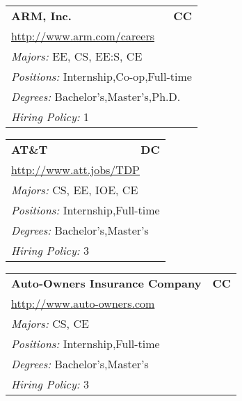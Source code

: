 \documentclass[twoside]{article}
\begin{document}
\begin{center}
\begin{multicols}{3}
\begin{FlushLeft}
\begin{minipage}{\columnwidth}
\end{minipage}
 
\begin{minipage}{\columnwidth}\begin{tabularx}{.95\columnwidth}{Xr}
                 {\Large\bf ARM, Inc.} & {\Large\bf CC}\\
    \multicolumn{2}{p{.95\columnwidth}}{\url{http://www.arm.com/careers}}\\
    \multicolumn{2}{p{.95\columnwidth}}{\emph{Majors:} EE, CS, EE:S, CE}\\
    \multicolumn{2}{p{.95\columnwidth}}{\emph{Positions:} Internship,Co-op,Full-time}\\
    \multicolumn{2}{p{.95\columnwidth}}{\emph{Degrees:} Bachelor's,Master's,Ph.D.}\\
    \multicolumn{2}{p{.95\columnwidth}}{\emph{Hiring Policy:} 1}\\
    \end{tabularx}
    
\end{minipage}
 
\begin{minipage}{\columnwidth}\begin{tabularx}{.95\columnwidth}{Xr}
                 {\Large\bf AT\&T} & {\Large\bf DC}\\
    \multicolumn{2}{p{.95\columnwidth}}{\url{http://www.att.jobs/TDP}}\\
    \multicolumn{2}{p{.95\columnwidth}}{\emph{Majors:} CS, EE, IOE, CE}\\
    \multicolumn{2}{p{.95\columnwidth}}{\emph{Positions:} Internship,Full-time}\\
    \multicolumn{2}{p{.95\columnwidth}}{\emph{Degrees:} Bachelor's,Master's}\\
    \multicolumn{2}{p{.95\columnwidth}}{\emph{Hiring Policy:} 3}\\
    \end{tabularx}
    
\end{minipage}
 
\begin{minipage}{\columnwidth}\begin{tabularx}{.95\columnwidth}{Xr}
                 {\Large\bf Auto-Owners Insurance Company} & {\Large\bf CC}\\
    \multicolumn{2}{p{.95\columnwidth}}{\url{http://www.auto-owners.com}}\\
    \multicolumn{2}{p{.95\columnwidth}}{\emph{Majors:} CS, CE}\\
    \multicolumn{2}{p{.95\columnwidth}}{\emph{Positions:} Internship,Full-time}\\
    \multicolumn{2}{p{.95\columnwidth}}{\emph{Degrees:} Bachelor's,Master's}\\
    \multicolumn{2}{p{.95\columnwidth}}{\emph{Hiring Policy:} 3}\\
    \end{tabularx}
    

\end{minipage}
\end{FlushLeft}
\end{multicols}
\end{center}
\end{document}

